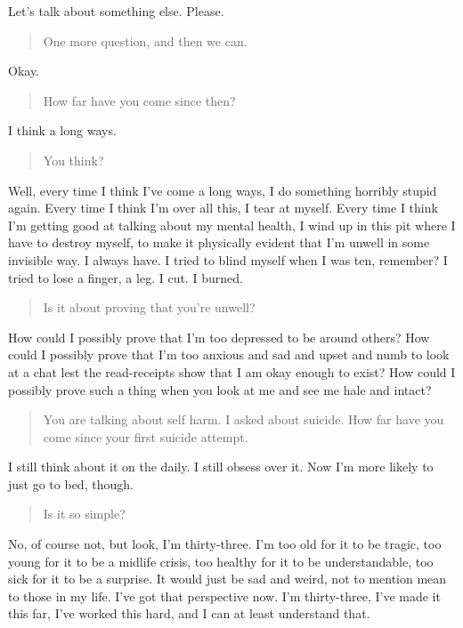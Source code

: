 Let's talk about something else. Please.

\begin{quote}
One more question, and then we can.
\end{quote}

Okay.

\begin{quote}
How far have you come since then?
\end{quote}

I think a long ways.

\begin{quote}
You think?
\end{quote}

Well, every time I think I've come a long ways, I do something horribly stupid again. Every time I think I'm over all this, I tear at myself. Every time I think I'm getting good at talking about my mental health, I wind up in this pit where I have to destroy myself, to make it physically evident that I'm unwell in some invisible way. I always have. I tried to blind myself when I was ten, remember? I tried to lose a finger, a leg. I cut. I burned.

\begin{quote}
Is it about proving that you're unwell?
\end{quote}

How could I possibly prove that I'm too depressed to be around others? How could I possibly prove that I'm too anxious and sad and upset and numb to look at a chat lest the read-receipts show that I am okay enough to exist? How could I possibly prove such a thing when you look at me and see me hale and intact?

\begin{quote}
You are talking about self harm. I asked about suicide. How far have you come since your first suicide attempt.
\end{quote}

I still think about it on the daily. I still obsess over it. Now I'm more likely to just go to bed, though.

\begin{quote}
Is it so simple?
\end{quote}

No, of course not, but look, I'm thirty-three. I'm too old for it to be tragic, too young for it to be a midlife crisis, too healthy for it to be understandable, too sick for it to be a surprise. It would just be sad and weird, not to mention mean to those in my life. I've got that perspective now. I'm thirty-three, I've made it this far, I've worked this hard, and I can at least understand that.

